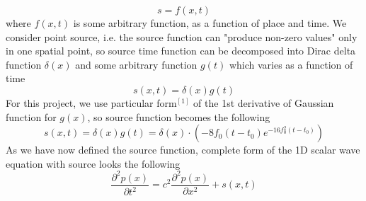 \documentclass[]{article}
\begin{document}
\begin{equation}
	s=f\left(x,t\right)
\end{equation}
where $f(x,t)$ is some arbitrary function, as a function of place and time. We consider point source, i.e. the source function can "produce non-zero values" only in one spatial point, so source time function can be decomposed into Dirac delta function $\delta\left(x\right)$ and some arbitrary function $g\left(t\right)$ which varies as a function of time
\begin{equation}
	s\left(x,t\right)=\delta\left(x\right)g\left(t\right)
\end{equation}
For this project, we use particular form$^{\left[1\right]}$ of the 1st derivative of Gaussian function for $g\left(x\right)$, so source function becomes the following
\begin{equation}
	s\left(x,t\right)=\delta\left(x\right)g\left(t\right)=\delta\left(x\right)\cdot\left(-8f_0\left(t-t_0\right)e^{-16f_0^2\left(t-t_0\right)}\right)
\end{equation}
As we have now defined the source function, complete form of the 1D scalar wave equation with source looks the following
\begin{equation}
	\frac{\partial^2 p\left(x\right)}{\partial t^2}=c^2\frac{\partial^2 p\left(x\right)}{\partial x^2}+s\left(x,t\right)
\end{equation}
\end{document}
